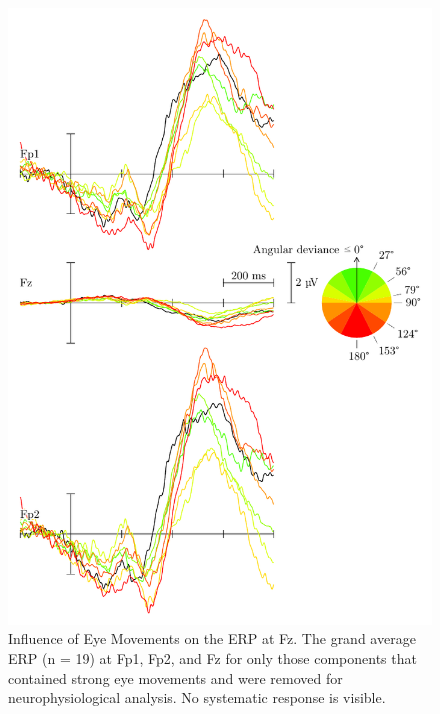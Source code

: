 \begin{figure}[p]
    \renewcommand\thefigure{\ref{chapter:nat}.S6}
    \centering
    \includegraphics[width=\textwidth]{figures/nat-app-fig-s6.pdf}
    \caption[Influence of Eye Movements on the ERP at Fz.]{Influence of Eye Movements on the ERP at Fz. The grand average ERP (n = 19) at Fp1, Fp2, and Fz for only those components that contained strong eye movements and were removed for neurophysiological analysis. No systematic response is visible.}
\end{figure}


